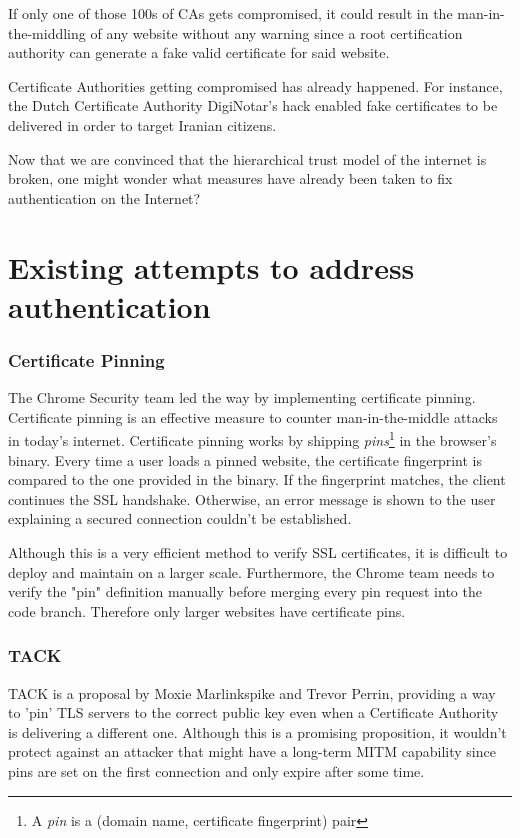 \documentclass{vldb}
\begin{document}
If only one of those 100s of CAs gets compromised, it could result in the man-in-the-middling of any website without any warning since a root certification authority can generate a fake valid certificate for said website.

Certificate Authorities getting compromised has already happened. For instance, the Dutch Certificate Authority DigiNotar's hack \cite{diginotarHack} enabled fake certificates to be delivered in order to target Iranian citizens.

Now that we are convinced that the hierarchical trust model of the internet is broken, one might wonder what measures have already been taken to fix authentication on the Internet?

\section{Existing attempts to address authentication}

\subsubsection{Certificate Pinning}

The Chrome Security team led the way by implementing certificate pinning. Certificate pinning is an effective measure to counter man-in-the-middle attacks in today's internet. Certificate pinning works by shipping \emph{pins}\footnote{A \emph{pin} is a (domain name, certificate fingerprint) pair} in the browser's binary.\cite{chromiumPins} Every time a user loads a pinned website, the certificate fingerprint is compared to the one provided in the binary. If the fingerprint matches, the client continues the SSL handshake. Otherwise, an error message is shown to the user explaining a secured connection couldn't be established.

Although this is a very efficient method to verify SSL certificates, it is difficult to deploy and maintain on a larger scale. Furthermore, the Chrome team needs to verify the "pin" definition manually before merging every pin request into the code branch. Therefore only larger websites have certificate pins.

\subsubsection{TACK}

TACK is a proposal by Moxie Marlinkspike and Trevor Perrin, providing a way to 'pin' TLS servers to the correct public key even when a Certificate Authority is delivering a different one. Although this is a promising proposition, it wouldn't protect against an attacker that might have a long-term MITM capability since pins are set on the first connection and only expire after some time.\cite{tackMITM}
\end{document}

